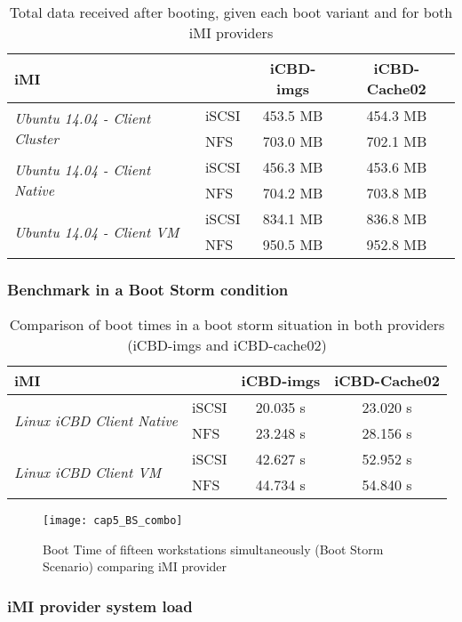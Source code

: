 \begin{table}[]
\centering
\begin{tabular}{llcc}
\textbf{iMI} &  & \textbf{iCBD-imgs} & \textbf{iCBD-Cache02} \\ \hline
\multirow{2}{*}{\textit{Ubuntu 14.04 - Client Cluster}} & iSCSI & 453.5 MB & 454.3 MB \\
 & NFS & 703.0 MB & 702.1 MB \\ \hline
\multirow{2}{*}{\textit{Ubuntu 14.04 - Client Native}} & iSCSI & 456.3 MB & 453.6 MB \\
 & NFS & 704.2 MB & 703.8 MB \\ \hline
\multirow{2}{*}{\textit{Ubuntu 14.04 - Client VM}} & iSCSI & 834.1 MB & 836.8 MB \\
 & NFS & 950.5 MB & 952.8 MB
\end{tabular}
\caption{Total data received after booting, given each boot variant and for both iMI providers}
\label{tab:boot_totaldata}
\end{table}

\subsubsection{Benchmark in a Boot Storm condition}
\label{susub:eval_cache_bootstorm}

\begin{table}[]
\centering
\begin{tabular}{llcc}
\textbf{iMI} & \textbf{} & \textbf{iCBD-imgs} & \textbf{iCBD-Cache02} \\ \hline
\multirow{2}{*}{\textit{Linux iCBD Client Native}} & iSCSI & 20.035 s & 23.020 s \\
 & NFS & 23.248 s & 28.156 s \\ \hline
\multirow{2}{*}{\textit{Linux iCBD Client VM}} & iSCSI & 42.627 s & 52.952 s \\
 & NFS & 44.734 s & 54.840 s
\end{tabular}
	\caption{Comparison of boot times in a boot storm situation in both providers (iCBD-imgs and iCBD-cache02)}
	\label{tab:bootstorm_both}
\end{table}


\begin{figure}[htbp]
	\centering
	\texttt{[image: cap5\_BS\_combo]}
	\caption{Boot Time of fifteen workstations simultaneously (Boot Storm Scenario) comparing iMI provider}
	\label{fig:bootstorm_time}
\end{figure}


\subsubsection{iMI provider system load}
\label{susub:eval_sys_load}

